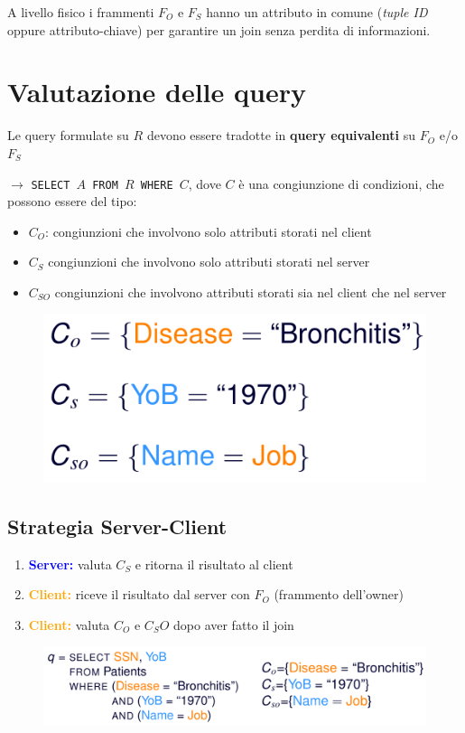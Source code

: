 \documentclass{report}
\begin{document}
A livello fisico i frammenti $F_O$ e $F_S$ hanno un attributo in comune (\textit{tuple ID} oppure attributo-chiave) 
per garantire un join senza perdita di informazioni. 

\section{Valutazione delle query}
Le query formulate su $R$ devono essere tradotte in \textbf{query equivalenti} su 
$F_O$ e/o $F_S$

$\rightarrow$ \texttt{SELECT $A$ FROM $R$ WHERE $C$}, dove $C$ è una congiunzione 
di condizioni, che possono essere del tipo:
\begin{itemize}
    \item $C_O$: congiunzioni che involvono solo attributi storati nel client 
    \item $C_S$ congiunzioni che involvono solo attributi storati nel server 
    \item $C_{SO}$ congiunzioni che involvono attributi storati sia nel client che nel server 
\end{itemize} 

\begin{figure}[ht]
    \centering
    \includegraphics[width=0.4\linewidth]{images/fragmentation/query-ex.png}
\end{figure}


\subsection{Strategia Server-Client}
\begin{enumerate}
    \item \textcolor{blue}{\textbf{Server:}} valuta $C_S$ e ritorna il risultato al client 
    \item \textcolor{orange}{\textbf{Client:}} riceve il risultato dal server con $F_O$ (frammento dell'owner)
    \item \textcolor{orange}{\textbf{Client:}} valuta $C_O$ e $C_SO$ dopo aver fatto il join 
\end{enumerate}

\begin{figure}[ht]
    \centering
    \includegraphics[width=0.9\linewidth]{images/fragmentation/sc-1.png}
\end{figure}
\end{document}
